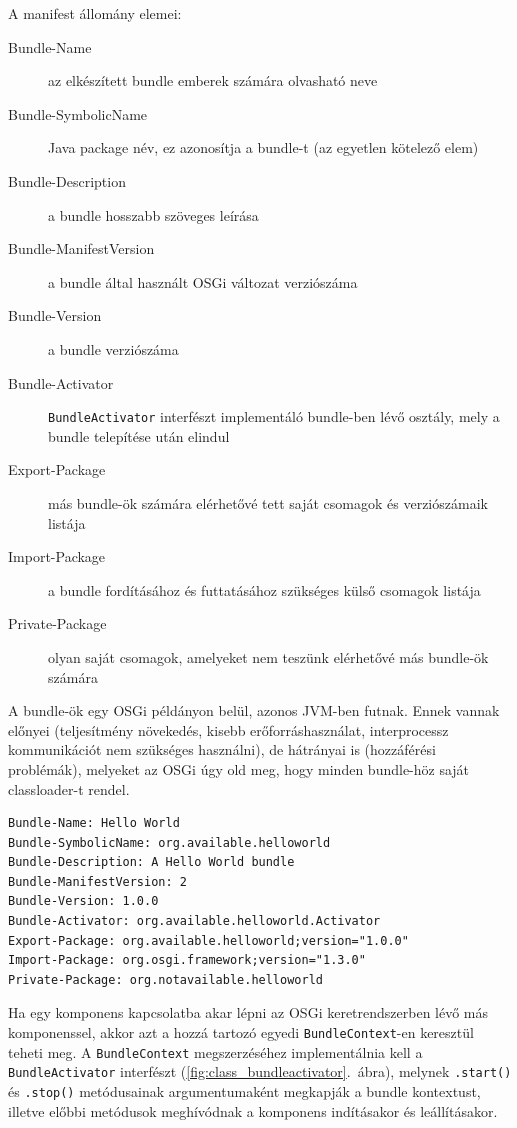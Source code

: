 A manifest állomány elemei:

\begin{description}
	\item[Bundle-Name] az elkészített bundle emberek számára olvasható neve
	\item[Bundle-SymbolicName] Java package név, ez azonosítja a bundle-t (az egyetlen kötelező elem)
	\item[Bundle-Description] a bundle hosszabb szöveges leírása
	\item[Bundle-ManifestVersion] a bundle által használt OSGi változat verziószáma
	\item[Bundle-Version] a bundle verziószáma
	\item[Bundle-Activator] \texttt{BundleActivator} interfészt implementáló bundle-ben lévő osztály, mely a bundle telepítése után elindul
	\item[Export-Package] más bundle-ök számára elérhetővé tett saját csomagok és verziószámaik listája
	\item[Import-Package] a bundle fordításához és futtatásához szükséges külső csomagok listája
	\item[Private-Package] olyan saját csomagok, amelyeket nem teszünk elérhetővé más bundle-ök számára
\end{description}

A bundle-ök egy OSGi példányon belül, azonos JVM-ben futnak. Ennek vannak előnyei (teljesítmény növekedés, kisebb erőforráshasználat, interprocessz kommunikációt nem szükséges használni), de hátrányai is (hozzáférési problémák), melyeket az OSGi úgy old meg, hogy minden bundle-höz saját classloader-t rendel.

\begin{lstlisting}[label={lst:manifest}, caption=MANIFEST.MF,breaklines=true]
Bundle-Name: Hello World
Bundle-SymbolicName: org.available.helloworld
Bundle-Description: A Hello World bundle
Bundle-ManifestVersion: 2
Bundle-Version: 1.0.0
Bundle-Activator: org.available.helloworld.Activator
Export-Package: org.available.helloworld;version="1.0.0"
Import-Package: org.osgi.framework;version="1.3.0"
Private-Package: org.notavailable.helloworld
\end{lstlisting}

Ha egy komponens kapcsolatba akar lépni az OSGi keretrendszerben lévő más komponenssel, akkor azt a hozzá tartozó egyedi \texttt{BundleContext}-en keresztül teheti meg. A \texttt{BundleContext} megszerzéséhez implementálnia kell a \texttt{BundleActivator} interfészt (\ref{fig:class_bundleactivator}.~ábra), melynek \texttt{.start()} és \texttt{.stop()} metódusainak argumentumaként megkapják a bundle kontextust, illetve előbbi metódusok meghívódnak a komponens indításakor és leállításakor.

